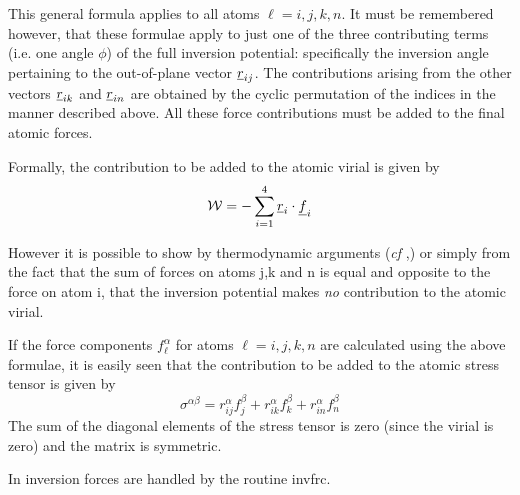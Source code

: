 This general formula applies to all atoms $\ell=i,j,k,n$. It must be
remembered however, that these formulae apply to just
one of the three contributing terms (i.e. one angle $\phi$) of the
full inversion potential: specifically the inversion angle pertaining
to the out-of-plane vector $\mbox{$\underline{r}$}_{ij}$. The contributions arising
from the other vectors $\mbox{$\underline{r}$}_{ik}$ and $\mbox{$\underline{r}$}_{in}$ are obtained
by the cyclic permutation of the indices in the manner described
above.  All these force contributions must be added to the final
atomic forces.

Formally, the contribution to be added to the
atomic virial is given by
\begin{equation}
{\cal W}=-\sum_{i=1}^{4}\mbox{$\underline{r}$}_{i}\cdot\mbox{$\underline{f}$}_{i}
\end{equation}

However it is possible to show by thermodynamic arguments ({\em cf}
\cite{smith-93c},) or simply from the fact that the sum of forces on
atoms j,k and n is equal and opposite to the force on atom i, that the
inversion potential makes {\em no} contribution to the atomic virial.

If the force components $f_{\ell}^{\alpha}$ for atoms $\ell=i,j,k,n$ are
calculated using the above formulae, it is easily seen that
the contribution to be added to the atomic stress tensor is given by
\begin{equation}
\sigma^{\alpha \beta}=r_{ij}^{\alpha}f_{j}^{\beta}+
r_{ik}^{\alpha}f_{k}^{\beta}+r_{in}^{\alpha}f_{n}^{\beta}
\end{equation}
The sum of the diagonal elements of the stress tensor is zero (since
the virial is zero) and the matrix is symmetric.

In \D{} inversion forces are handled by the routine {\sc invfrc}.

